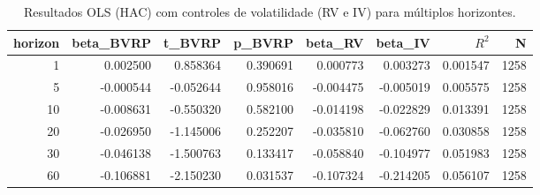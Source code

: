 \begin{table}[H]
\centering
\caption{Resultados OLS (HAC) com controles de volatilidade (RV e IV) para múltiplos horizontes.}
\label{tab:ols_controles_multihoriz}
\footnotesize
\begin{adjustbox}{max width=\textwidth}
\begin{tabular}{rrrrrrrr}
\toprule
horizon & beta\_BVRP & t\_BVRP & p\_BVRP & beta\_RV & beta\_IV & $R^2$ & N \\
\midrule
1  & 0.002500  &  0.858364 & 0.390691 &  0.000773 &  0.003273 & 0.001547 & 1258 \\
5  & -0.000544 & -0.052644 & 0.958016 & -0.004475 & -0.005019 & 0.005575 & 1258 \\
10 & -0.008631 & -0.550320 & 0.582100 & -0.014198 & -0.022829 & 0.013391 & 1258 \\
20 & -0.026950 & -1.145006 & 0.252207 & -0.035810 & -0.062760 & 0.030858 & 1258 \\
30 & -0.046138 & -1.500763 & 0.133417 & -0.058840 & -0.104977 & 0.051983 & 1258 \\
60 & -0.106881 & -2.150230 & 0.031537 & -0.107324 & -0.214205 & 0.056107 & 1258 \\
\bottomrule
\end{tabular}
\end{adjustbox}
\end{table}
